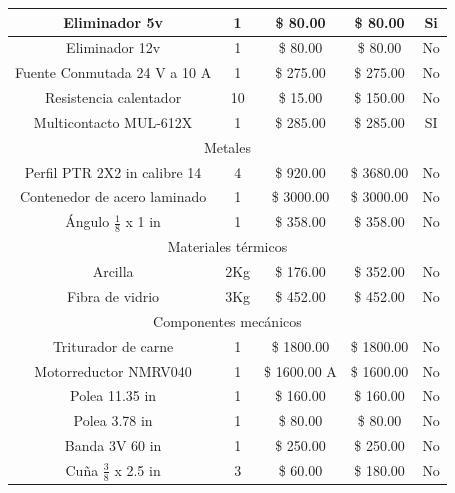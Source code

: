 \begin{table}[h!]
\begin{center}
\begin{tabular}{ | c | c | c | c | c |}
                Eliminador 5v  & 1 & \$ 80.00 & \$ 80.00 & Si  \\ \hline
                Eliminador 12v  & 1 & \$ 80.00 & \$ 80.00 & No  \\ \hline
                Fuente Conmutada 24 V a 10 A  & 1 & \$ 275.00 & \$ 275.00 & No  \\ \hline
                Resistencia calentador  & 10 & \$ 15.00 & \$ 150.00 & No  \\ \hline
                Multicontacto MUL-612X  & 1 & \$ 285.00 & \$ 285.00 & SI  \\ \hline
                \multicolumn{5}{c}{Metales}\\ \hline
                Perfil PTR 2X2 in calibre 14  & 4 & \$ 920.00 & \$ 3680.00 & No  \\ \hline
                Contenedor de acero laminado & 1 & \$ 3000.00 & \$ 3000.00  & No  \\ \hline
                Ángulo $\frac{1}{8}$ x 1 in  & 1 & \$ 358.00 & \$ 358.00 & No  \\ \hline
                \multicolumn{5}{c}{Materiales térmicos}\\ \hline
                Arcilla  & 2Kg & \$ 176.00 & \$ 352.00 & No  \\ \hline
                Fibra de vidrio  & 3Kg & \$ 452.00 & \$ 452.00 & No  \\ \hline
                \multicolumn{5}{c}{Componentes mecánicos}\\ \hline
                Triturador de carne  & 1 & \$ 1800.00 & \$ 1800.00 & No  \\ \hline
                Motorreductor NMRV040 & 1 & \$ 1600.00 A & \$ 1600.00 & No  \\ \hline
                Polea 11.35 in  & 1 & \$ 160.00 & \$ 160.00 & No  \\ \hline
                Polea 3.78 in  & 1 & \$ 80.00 & \$ 80.00 & No  \\ \hline
                Banda 3V 60 in  & 1 & \$ 250.00 & \$ 250.00 & No  \\ \hline
                Cuña $\frac{3}{8}$ x 2.5 in & 3 &  \$ 60.00& \$ 180.00 & No  \\ \hline
            \end{tabular}
            \label{tab:cost_mat}
        \end{center}
    \end{table}

